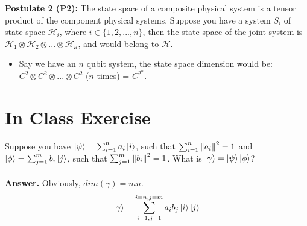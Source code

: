 \documentclass[11.5pt, paper=a4]{article}
\theoremstyle{definition}
\numberwithin{theorem}{section}
\begin{document}
\textbf{Postulate 2 (P2):} The state space of a composite physical system is a tensor product of the component physical systems. Suppose you have a system $S_i$ of state space $\mathcal{H}_i$, where $i \in \{1,2,...,n\}$, then the state space of the joint system is $\mathcal{H_1} \otimes \mathcal{H_2} \otimes ... \otimes \mathcal{H_n}$, and would belong to $\mathcal{H}$.
\begin{itemize}
    \item Say we have an $n$ qubit system, the state space dimension would be: $C^2 \otimes C^2 \otimes ... \otimes C^2$ ($n$ times) = $C^{2^n}$.
\end{itemize}

\section{In Class Exercise}
Suppose you have $\ket{\psi} = \sum_{i=1}^n a_i \ket{i}$, such that $\sum_{i=1}^n \norm{a_i}^2 = 1$ and $\ket{\phi} = \sum_{j=1}^m b_i \ket{j}$, such that $\sum_{j=1}^m \norm{b_i}^2 = 1$. What is $\ket{\gamma} = \ket{\psi}\ket{\phi}$?
\\
\\
\textbf{Answer.} Obviously, $dim(\gamma) = mn$.
\begin{equation*}
    \ket{\gamma} = \sum_{i=1,j=1}^{i=n, j=m} a_i b_j \ket{i} \ket{j}
\end{equation*}
\nocite{nielsen00}
\nocite{preskill}


\end{document}
